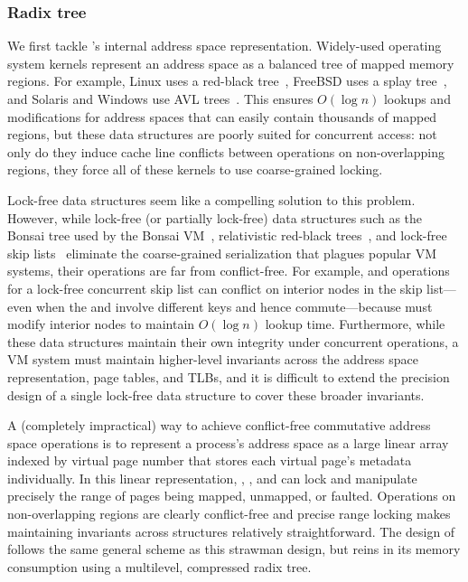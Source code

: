 \subsubsection{Radix tree}
\label{sec:radixvm:tree}
\label{sec:topic:linux-coarse}


We first tackle \vm's internal address space representation.
%
Widely-used operating system kernels represent an address space as a
balanced tree of mapped memory regions.  For example, Linux uses a
red-black tree~\cite{linux-source}, FreeBSD uses a splay
tree~\cite{freebsd-source}, and Solaris and Windows use AVL
trees~\cite{windows:wrk,windows:slides}.  This ensures $O(\log n)$ lookups
and modifications for address spaces that can easily contain thousands
of mapped regions, but these data structures are poorly suited for
concurrent access: not only do they induce cache line conflicts
between operations on non-overlapping regions, they force all of these
kernels to use coarse-grained locking.

Lock-free data structures seem like a compelling solution to this
problem.  However, while lock-free (or partially lock-free) data
structures such as the Bonsai tree used by the Bonsai
VM~\cite{clements:bonsai}, relativistic red-black
trees~\cite{howard:relrbtree}, and lock-free skip
lists~\cite{herlihy:art} eliminate the coarse-grained serialization
that plagues popular VM systems, their operations are far from
conflict-free.  For example,  and 
operations for a lock-free concurrent skip list can conflict on
interior nodes in the skip list---even when the  and
 involve different keys and hence commute---because
 must modify interior nodes to maintain $O(\log n)$
lookup time.
Furthermore, while these data structures maintain their own integrity
under concurrent operations, a VM system must maintain higher-level
invariants across the address space representation, page tables, and
TLBs, and it is difficult to extend the precision design of a single
lock-free data structure to cover these broader invariants.

A (completely impractical) way to achieve conflict-free commutative
address space
operations is to represent a process's address space as a large linear
array indexed by virtual page number that stores each virtual page's
metadata individually.
%
In this linear representation, , ,
and  can lock and manipulate precisely the range of
pages being mapped, unmapped, or faulted.
%
Operations on non-overlapping regions are clearly conflict-free and
precise range locking makes maintaining invariants across structures
relatively straightforward.
%
The design of \vm follows the same general
scheme as this strawman design, but reins in its memory consumption
using a multilevel, compressed radix tree.

